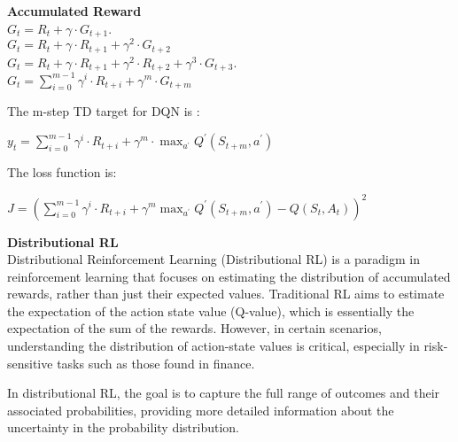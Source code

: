 \documentclass{article}
\begin{document}
\begin{mdframed}[hidealllines=false,backgroundcolor=white!20]
\textbf{Accumulated Reward}\\

$G_t=R_t+\gamma \cdot G_{t+1}$.\\

$G_t=R_t+\gamma \cdot R_{t+1}+\gamma^2 \cdot G_{t+2}$\\

$G_t=R_t+\gamma \cdot R_{t+1}+\gamma^2 \cdot R_{t+2}+\gamma^3 \cdot G_{t+3}$.\\

$G_t=\sum_{i=0}^{m-1} \gamma^i \cdot R_{t+i}+\gamma^m \cdot G_{t+m}$\\
\end{mdframed}

\noindent
The m-step TD target for DQN is :

\hspace*{\fill}

$y_t=\sum_{i=0}^{m-1} \gamma^i \cdot R_{t+i}+\gamma^m \cdot \max _{a^{\prime}} Q^{\prime}\left(S_{t+m}, a^{\prime}\right)$

\hspace*{\fill}

\noindent
The loss function is:

\hspace*{\fill}

$J = \left(\sum_{i=0}^{m-1} \gamma^i \cdot R_{t+i}+\gamma^{m} \max _{a^{\prime}} Q^{\prime}\left(S_{t+m}, a^{\prime}\right)-Q\left(S_t, A_t\right)\right)^2$

\hspace*{\fill}

\noindent
\textbf{Distributional RL}\\
\noindent
Distributional Reinforcement Learning (Distributional RL) is a paradigm in reinforcement learning that focuses on estimating the distribution of accumulated rewards, rather than just their expected values. Traditional RL aims to estimate the expectation of the action state value (Q-value), which is essentially the expectation of the sum of the rewards. However, in certain scenarios, understanding the distribution of action-state values is critical, especially in risk-sensitive tasks such as those found in finance.

In distributional RL, the goal is to capture the full range of outcomes and their associated probabilities, providing more detailed information about the uncertainty in the probability distribution.
\end{document}
